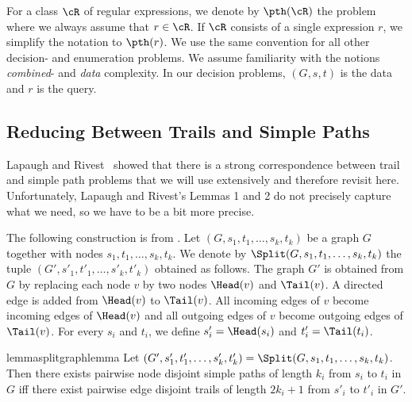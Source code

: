\documentclass[a4paper,english]{lipics-v2016}
\theoremstyle{plain}
\begin{document}
For a class $\cR$ of regular expressions, we denote by $\pth(\cR)$ the
problem \pth where we always assume that $r \in \cR$. If $\cR$ consists of a single expression $r$,
we simplify the notation to $\pth(r)$. We use the same convention for
all other decision- and enumeration problems.
We assume familiarity with the notions \emph{combined}- and
\emph{data} complexity. In our decision problems, $(G,s,t)$ is the
data and $r$ is the query.

\subsection{Reducing Between Trails and Simple
  Paths}\label{sec:trails-simplepaths}
Lapaugh and Rivest~\cite{LapaughR-jcss80} showed that there is a
strong correspondence between trail and simple path problems that we
will use extensively and therefore revisit here. Unfortunately,
Lapaugh and Rivest's Lemmas 1 and 2 do not precisely capture what we
need, so we have to be a bit more precise.

The following construction is from \cite[Proof of Lemma 1]{LapaughR-jcss80}.
Let $(G,s_1,t_1,\ldots,s_k,t_k)$ be a graph $G$ together with nodes
$s_1,t_1,\ldots,s_k,t_k$. We denote by $\Split(G,s_1,t_1,\ldots,s_k,t_k)$ the
tuple $(G',s'_1,t'_1,\ldots,s'_k,t'_k)$ obtained as follows. The graph
$G'$ is obtained from $G$ by replacing each node $v$ by two nodes
$\Head(v)$ and $\Tail(v)$. A directed edge is added from $\Head(v)$ to
$\Tail(v)$. All incoming edges of $v$ become incoming edges of
$\Head(v)$ and all outgoing edges of $v$ become outgoing edges of
$\Tail(v)$. For every $s_i$ and $t_i$, we define $s'_i = \Head(s_i)$
and $t'_i = \Tail(t_i)$. 

\begin{restatable}{lemma}{splitgraphlemma}\label{lem:splitgraph}
  Let $(G',s'_1,t'_1,\ldots,s'_k,t'_k) =
  \Split(G,s_1,t_1,\ldots,s_k,t_k)$. Then there
  exists pairwise node disjoint simple paths of length $k_i$ from
  $s_i$ to $t_i$ in $G$ iff there exist pairwise edge disjoint trails
  of length $2k_i + 1$ from $s'_i$ to $t'_i$ in $G'$.
\end{restatable}
\end{document}
